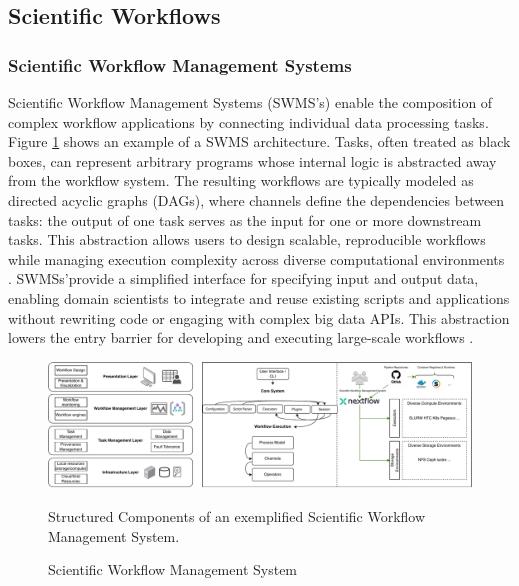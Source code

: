\subsection{Scientific Workflows}
\label{sec:background_workflows}
\subsubsection{Scientific Workflow Management Systems}
\label{sec:background_workflows_swms}
Scientific Workflow Management Systems (SWMS's) enable the composition of complex workflow applications by connecting individual data processing tasks. Figure \ref{fig:02-swms} shows an example of a SWMS architecture. Tasks, often treated as black boxes, can represent arbitrary programs whose internal logic is abstracted away from the workflow system. The resulting workflows are typically modeled as directed acyclic graphs (DAGs), where channels define the dependencies between tasks: the output of one task serves as the input for one or more downstream tasks. This abstraction allows users to design scalable, reproducible workflows while managing execution complexity across diverse computational environments \cite{thamsen2025energyawareworkflowexecutionoverview}.
SWMSs'provide a simplified interface for specifying input and output data, enabling domain scientists to integrate and reuse existing scripts and applications without rewriting code or engaging with complex big data APIs. This abstraction lowers the entry barrier for developing and executing large-scale workflows \cite{Bader_2022}.

\begin{figure}[H]
    \centering
    \includegraphics[scale=0.45]{fig/02/02-swms.pdf}
    \small
    \caption{Scientific Workflow Management System}
    \label{fig:02-swms}
    \tiny
    Structured Components of an exemplified Scientific Workflow Management System.
\end{figure}

